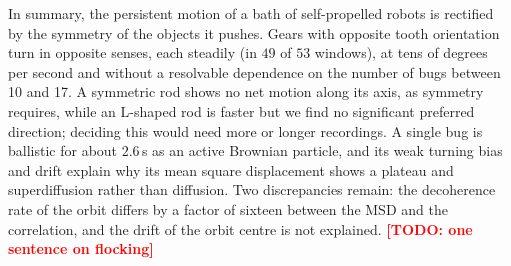 \documentclass[11pt]{article}
\newcommand{\todo}[1]{\textcolor{red}{\textbf{[TODO: #1]}}}
\begin{document}
In summary, the persistent motion of a bath of self-propelled robots is rectified by the symmetry of the objects it pushes.
Gears with opposite tooth orientation turn in opposite senses, each steadily (in $49$ of $53$ windows), at tens of degrees per second and without a resolvable dependence on the number of bugs between 10 and 17.
A symmetric rod shows no net motion along its axis, as symmetry requires, while an L-shaped rod is faster but we find no significant preferred direction; deciding this would need more or longer recordings.
A single bug is ballistic for about $2.6\,$s as an active Brownian particle, and its weak turning bias and drift explain why its mean square displacement shows a plateau and superdiffusion rather than diffusion.
Two discrepancies remain: the decoherence rate of the orbit differs by a factor of sixteen between the MSD and the correlation, and the drift of the orbit centre is not explained.
\todo{one sentence on flocking}


\end{document}
